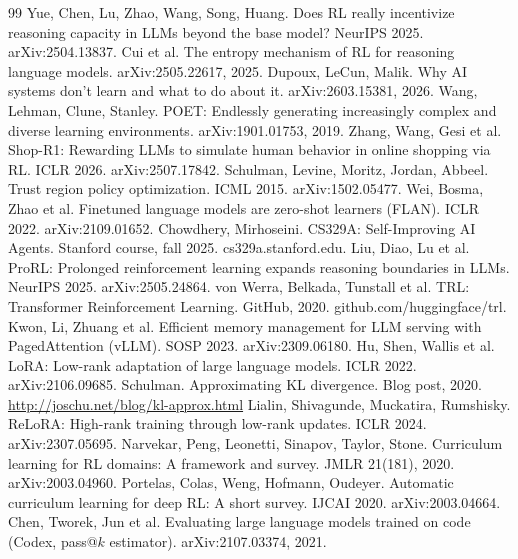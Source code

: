 \documentclass[11pt,a4paper]{article}
\begin{document}
\begin{thebibliography}{99}
 Yue, Chen, Lu, Zhao, Wang, Song, Huang. Does RL really incentivize reasoning capacity in LLMs beyond the base model? NeurIPS 2025. arXiv:2504.13837.
 Cui et al. The entropy mechanism of RL for reasoning language models. arXiv:2505.22617, 2025.
 Dupoux, LeCun, Malik. Why AI systems don't learn and what to do about it. arXiv:2603.15381, 2026.
 Wang, Lehman, Clune, Stanley. POET: Endlessly generating increasingly complex and diverse learning environments. arXiv:1901.01753, 2019.
 Zhang, Wang, Gesi et al. Shop-R1: Rewarding LLMs to simulate human behavior in online shopping via RL. ICLR 2026. arXiv:2507.17842.
 Schulman, Levine, Moritz, Jordan, Abbeel. Trust region policy optimization. ICML 2015. arXiv:1502.05477.
 Wei, Bosma, Zhao et al. Finetuned language models are zero-shot learners (FLAN). ICLR 2022. arXiv:2109.01652.
 Chowdhery, Mirhoseini. CS329A: Self-Improving AI Agents. Stanford course, fall 2025. cs329a.stanford.edu.
 Liu, Diao, Lu et al. ProRL: Prolonged reinforcement learning expands reasoning boundaries in LLMs. NeurIPS 2025. arXiv:2505.24864.
 von Werra, Belkada, Tunstall et al. TRL: Transformer Reinforcement Learning. GitHub, 2020. github.com/huggingface/trl.
 Kwon, Li, Zhuang et al. Efficient memory management for LLM serving with PagedAttention (vLLM). SOSP 2023. arXiv:2309.06180.
 Hu, Shen, Wallis et al. LoRA: Low-rank adaptation of large language models. ICLR 2022. arXiv:2106.09685.
 Schulman. Approximating KL divergence. Blog post, 2020. \url{http://joschu.net/blog/kl-approx.html}
 Lialin, Shivagunde, Muckatira, Rumshisky. ReLoRA: High-rank training through low-rank updates. ICLR 2024. arXiv:2307.05695.
 Narvekar, Peng, Leonetti, Sinapov, Taylor, Stone. Curriculum learning for RL domains: A framework and survey. JMLR 21(181), 2020. arXiv:2003.04960.
 Portelas, Colas, Weng, Hofmann, Oudeyer. Automatic curriculum learning for deep RL: A short survey. IJCAI 2020. arXiv:2003.04664.
 Chen, Tworek, Jun et al. Evaluating large language models trained on code (Codex, pass@$k$ estimator). arXiv:2107.03374, 2021.
\end{thebibliography}
\end{document}
